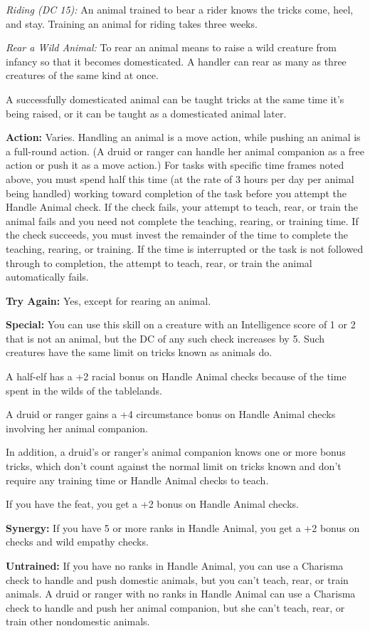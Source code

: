 \emph{Riding (DC 15):} An animal trained to bear a rider knows the tricks come, heel, and stay. Training an animal for riding takes three weeks.

\textit{Rear a Wild Animal:} To rear an animal means to raise a wild creature from infancy so that it becomes domesticated. A handler can rear as many as three creatures of the same kind at once.

A successfully domesticated animal can be taught tricks at the same time it's being raised, or it can be taught as a domesticated animal later.

\textbf{Action:} Varies. Handling an animal is a move action, while pushing an animal is a full-round action. (A druid or ranger can handle her animal companion as a free action or push it as a move action.) For tasks with specific time frames noted above, you must spend half this time (at the rate of 3 hours per day per animal being handled) working toward completion of the task before you attempt the Handle Animal check. If the check fails, your attempt to teach, rear, or train the animal fails and you need not complete the teaching, rearing, or training time. If the check succeeds, you must invest the remainder of the time to complete the teaching, rearing, or training. If the time is interrupted or the task is not followed through to completion, the attempt to teach, rear, or train the animal automatically fails.

\textbf{Try Again:} Yes, except for rearing an animal.

\textbf{Special:} You can use this skill on a creature with an Intelligence score of 1 or 2 that is not an animal, but the DC of any such check increases by 5. Such creatures have the same limit on tricks known as animals do.

A half-elf has a +2 racial bonus on Handle Animal checks because of the time spent in the wilds of the tablelands.

A druid or ranger gains a +4 circumstance bonus on Handle Animal checks involving her animal companion.

In addition, a druid's or ranger's animal companion knows one or more bonus tricks, which don't count against the normal limit on tricks known and don't require any training time or Handle Animal checks to teach.

If you have the  feat, you get a +2 bonus on Handle Animal checks.

\textbf{Synergy:} If you have 5 or more ranks in Handle Animal, you get a +2 bonus on  checks and wild empathy checks.

\textbf{Untrained:} If you have no ranks in Handle Animal, you can use a Charisma check to handle and push domestic animals, but you can't teach, rear, or train animals. A druid or ranger with no ranks in Handle Animal can use a Charisma check to handle and push her animal companion, but she can't teach, rear, or train other nondomestic animals.


